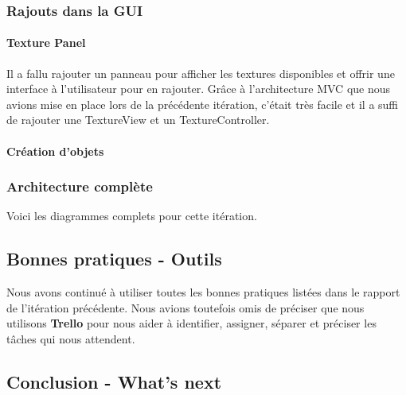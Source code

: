 	\subsubsection{Rajouts dans la GUI}

		\paragraph{Texture Panel}
		Il a fallu rajouter un panneau pour afficher les textures disponibles et
		offrir une interface à l'utilisateur pour en rajouter. Grâce à 
		l'architecture MVC que nous avions mise en place lors de la précédente 
		itération, c'était très facile et il a suffi de rajouter une TextureView
		et un TextureController.

		\paragraph{Création d'objets}

	\subsubsection{Architecture complète}
	Voici les diagrammes complets pour cette itération.


\subsection{Bonnes pratiques - Outils}

Nous avons continué à utiliser toutes les bonnes pratiques listées dans le
rapport de l'itération précédente. Nous avions toutefois omis de préciser que
nous utilisons \textbf{Trello} pour nous aider à identifier, assigner, séparer 
et préciser les tâches qui nous attendent. 

\subsection{Conclusion - What's next}

